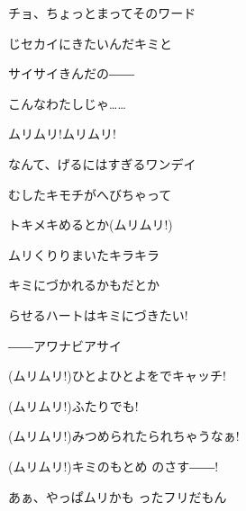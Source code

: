 \documentclass[a4paper,tate,twocolumn,12pt]{ltjtarticle}
\begin{document}
\begin{flushleft}
\vspace{2em}

\noindent\begin{minipage}{\linewidth}
チョ、ちょっとまってそのワード

じセカイにきたいんだキミと

サイサイきんだの――

こんなわたしじゃ……
\end{minipage}

\vspace{2em}

\noindent\begin{minipage}{\linewidth}
ムリムリ!ムリムリ!

なんて、げるにはすぎるワンデイ

むしたキモチがへびちゃって

トキメキめるとか(ムリムリ!)
\end{minipage}

\vspace{2em}

\noindent\begin{minipage}{\linewidth}
ムリくりりまいたキラキラ

キミにづかれるかもだとか

らせるハートはキミにづきたい!

――アワナビアサイ
\end{minipage}

\vspace{2em}

\noindent\begin{minipage}{\linewidth}
(ムリムリ!)ひとよひとよをでキャッチ!

(ムリムリ!)ふたりでも!

(ムリムリ!)みつめられたられちゃうなぁ!

(ムリムリ!)キミのもとめ のさす――!
\end{minipage}

\vspace{2em}

\noindent\begin{minipage}{\linewidth}
あぁ、やっぱムリかも ったフリだもん


\end{minipage}
\end{flushleft}
\end{document}
